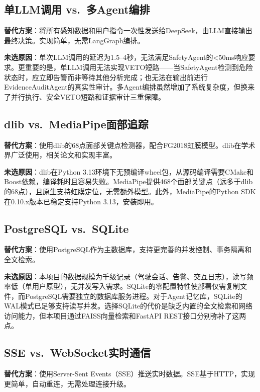 \documentclass[a4paper]{article}
\begin{document}
\subsection{单LLM调用 vs.\ 多Agent编排}

\textbf{替代方案}：将所有感知数据和用户指令一次性发送给DeepSeek，由LLM直接输出最终决策。实现简单，无需LangGraph编排。

\textbf{未选原因}：单次LLM调用的延迟为1.5--4秒，无法满足SafetyAgent的<50ms响应要求。更重要的是，单LLM调用无法实现VETO短路——当SafetyAgent检测到危险状态时，应立即告警而非等待其他分析完成；也无法在输出前进行EvidenceAuditAgent的真实性审计。多Agent编排虽然增加了系统复杂度，但换来了并行执行、安全VETO短路和证据审计三重保障。

\subsection{dlib vs.\ MediaPipe面部追踪}

\textbf{替代方案}：使用dlib的68点面部关键点检测器，配合FG2018虹膜模型。dlib在学术界广泛使用，相关论文和实现丰富。

\textbf{未选原因}：dlib在Python 3.13环境下无预编译wheel包，从源码编译需要CMake和Boost依赖，编译耗时且容易失败。MediaPipe提供468个面部关键点（远多于dlib的68点），且原生支持虹膜定位，无需额外模型。此外，MediaPipe的Python SDK在0.10.x版本已稳定支持Python 3.13，安装即用。

\subsection{PostgreSQL vs.\ SQLite}

\textbf{替代方案}：使用PostgreSQL作为主数据库，支持更完善的并发控制、事务隔离和全文检索。

\textbf{未选原因}：本项目的数据规模为千级记录（驾驶会话、告警、交互日志），读写频率低（单用户原型），无并发写入需求。SQLite的零配置特性使部署仅需复制文件，而PostgreSQL需要独立的数据库服务进程。对于Agent记忆库，SQLite的WAL模式已足够支持读写并发。选择SQLite的代价是缺乏内置的全文检索和网络访问能力，但本项目通过FAISS向量检索和FastAPI REST接口分别弥补了这两点。

\subsection{SSE vs.\ WebSocket实时通信}

\textbf{替代方案}：使用Server-Sent Events（SSE）推送实时数据。SSE基于HTTP，实现更简单，自动重连，无需处理连接升级。
\end{document}
